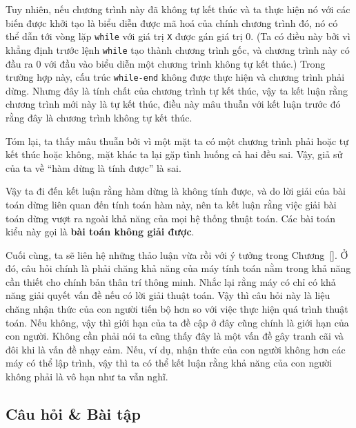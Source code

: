 Tuy nhiên, nếu chương trình này đã không tự kết thúc và ta thực hiện nó với các biến được
khởi tạo là biểu diễn được mã hoá của chính chương trình đó, nó có thể dẫn tới vòng lặp
\texttt{while} với giá trị \texttt{X} được gán giá trị $0$. (Ta có điều này bởi vì khẳng
định trước lệnh \texttt{while} tạo thành chương trình gốc, và chương trình này có đầu ra
$0$ với đầu vào biểu diễn một chương trình không tự kết thúc.) Trong trường hợp này, cấu
trúc \texttt{while-end} không được thực hiện và chương trình phải dừng. Nhưng đây là tính
chất của chương trình tự kết thúc, vậy ta kết luận rằng chương trình mới này là tự kết
thúc, điều này mâu thuẫn với kết luận trước đó rằng đây là chương trình không tự kết thúc.

Tóm lại, ta thấy mâu thuẫn bởi vì một mặt ta có một chương trình phải hoặc tự kết thúc
hoặc không, mặt khác ta lại gặp tình huống cả hai đều sai. Vậy, giả sử của ta về ``hàm
dừng là tính được'' là sai.

Vậy ta đi đến kết luận rằng hàm dừng là không tính được, và do lời giải của bài toán dừng
liên quan đến tính toán hàm này, nên ta kết luận rằng việc giải bài toán dừng vượt ra
ngoài khả năng của mọi hệ thống thuật toán. Các bài toán kiểu này gọi là \textbf{bài toán
  không giải được}.



Cuối cùng, ta sẽ liên hệ những thảo luận vừa rồi với ý tưởng trong Chương~\ref{}. Ở đó,
câu hỏi chính là phải chăng khả năng của máy tính toán nằm trong khả năng cần thiết cho
chính bản thân trí thông minh. Nhắc lại rằng máy có chỉ có khả năng giải quyết vấn đề nếu
có lời giải thuật toán. Vậy thì câu hỏi này là liệu chăng nhận thức của con người tiến bộ
hơn so với việc thực hiện quá trình thuật toán. Nếu không, vậy thì giới hạn của ta đề cập
ở đây cũng chính là giới hạn của con người. Không cần phải nói ta cũng thấy đây là một vấn
đề gây tranh cãi và đôi khi là vấn đề nhạy cảm. Nếu, ví dụ, nhận thức của con người không
hơn các máy có thể lập trình, vậy thì ta có thể kết luận rằng khả năng của con người không
phải là vô hạn như ta vẫn nghĩ.



\subsection*{Câu hỏi \& Bài tập}
 
